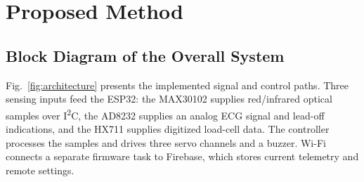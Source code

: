 \section{Proposed Method}\label{sec:method}
\subsection{Block Diagram of the Overall System}
Fig.~\ref{fig:architecture} presents the implemented signal and control paths. Three sensing inputs feed the ESP32: the MAX30102 supplies red/infrared optical samples over I\textsuperscript{2}C, the AD8232 supplies an analog ECG signal and lead-off indications, and the HX711 supplies digitized load-cell data. The controller processes the samples and drives three servo channels and a buzzer. Wi-Fi connects a separate firmware task to Firebase, which stores current telemetry and remote settings.

